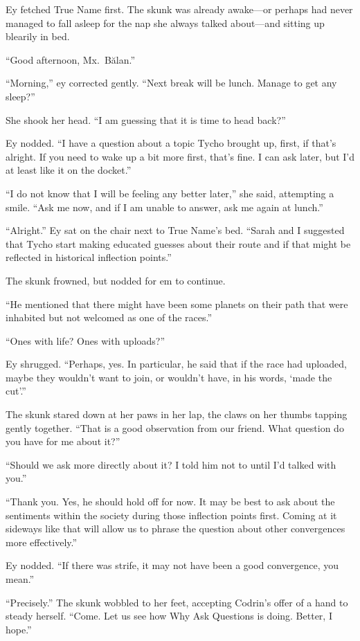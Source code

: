 Ey fetched True Name first. The skunk was already awake—or perhaps had never managed to fall asleep for the nap she always talked about—and sitting up blearily in bed.

``Good afternoon, Mx.~Bălan.''

``Morning,'' ey corrected gently. ``Next break will be lunch. Manage to get any sleep?''

She shook her head. ``I am guessing that it is time to head back?''

Ey nodded. ``I have a question about a topic Tycho brought up, first, if that's alright. If you need to wake up a bit more first, that's fine. I can ask later, but I'd at least like it on the docket.''

``I do not know that I will be feeling any better later,'' she said, attempting a smile. ``Ask me now, and if I am unable to answer, ask me again at lunch.''

``Alright.'' Ey sat on the chair next to True Name's bed. ``Sarah and I suggested that Tycho start making educated guesses about their route and if that might be reflected in historical inflection points.''

The skunk frowned, but nodded for em to continue.

``He mentioned that there might have been some planets on their path that were inhabited but not welcomed as one of the races.''

``Ones with life? Ones with uploads?''

Ey shrugged. ``Perhaps, yes. In particular, he said that if the race had uploaded, maybe they wouldn't want to join, or wouldn't have, in his words, `made the cut'.''

The skunk stared down at her paws in her lap, the claws on her thumbs tapping gently together. ``That is a good observation from our friend. What question do you have for me about it?''

``Should we ask more directly about it? I told him not to until I'd talked with you.''

``Thank you. Yes, he should hold off for now. It may be best to ask about the sentiments within the society during those inflection points first. Coming at it sideways like that will allow us to phrase the question about other convergences more effectively.''

Ey nodded. ``If there was strife, it may not have been a good convergence, you mean.''

``Precisely.'' The skunk wobbled to her feet, accepting Codrin's offer of a hand to steady herself. ``Come. Let us see how Why Ask Questions is doing. Better, I hope.''

